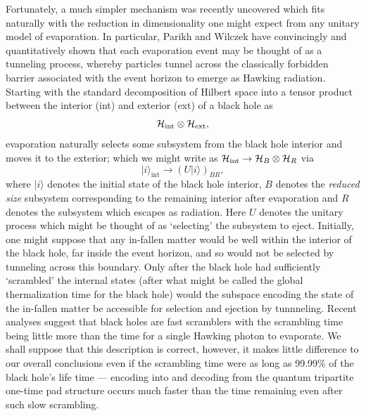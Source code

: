 \documentclass[aps,12pt]{revtex4}
\begin{document}
Fortunately, a much simpler mechanism was recently uncovered which
fits naturally with the reduction in dimensionality one might expect from
any unitary model of evaporation. In particular, Parikh and
Wilczek \cite{ParikhWilczek} have convincingly and quantitatively shown
that each evaporation event may be thought of as a tunneling process,
whereby particles tunnel across the classically forbidden barrier
associated with the event horizon to emerge as Hawking radiation.
Starting with the standard decomposition of Hilbert space into a
tensor product between the interior (int) and exterior (ext) of a
black hole as \cite{Hawking76}
\begin{equation}
{\cal H}_{\text{int}}\otimes{\cal H}_{\text{ext}},
\end{equation}
evaporation naturally selects some subsystem from the black hole interior
and moves it to the exterior; which we might write as
${\cal H}_{\text{int}}\rightarrow{\cal H}_B\otimes {\cal H}_R$ via
\begin{equation}
|i\rangle_{\text{int}}\rightarrow (U|i\rangle)_{BR}, \label{Umodel}
\end{equation}
where $|i\rangle$ denotes the initial state of the black hole interior,
$B$ denotes the {\it reduced size\/} subsystem corresponding to
the remaining interior after evaporation and $R$ denotes the subsystem
which escapes as radiation. Here $U$ denotes the unitary process which
might be thought of as `selecting' the subsystem to eject.
Initially, one might suppose that any in-fallen matter would be well within
the interior of the black hole, far inside the event horizon, and so would
not be selected by tunneling across this boundary. Only after the
black hole had sufficiently `scrambled' the internal states (after
what might be called the global thermalization time for the black hole)
would the subspace encoding the state of the in-fallen matter be
accessible for selection and ejection by tunnneling. Recent analyses
suggest that black holes are fast scramblers \cite{Sekino08,Hayden07}
with the scrambling time being little more than the time for a
single Hawking photon to evaporate. We shall suppose that this description
is correct, however, it makes little difference to our overall conclusions
even if the scrambling time were as long as 99.99\% of the black hole's
life time \cite{Giddings07} --- encoding into and decoding from the
quantum tripartite one-time pad structure occurs much faster than the
time remaining even after such slow scrambling.
\end{document}
